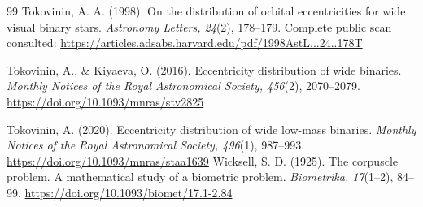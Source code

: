 \documentclass[11pt,a4paper]{article}
\theoremstyle{remark}\newtheorem{remark}[theorem]{Remark}
\begin{document}
\begin{thebibliography}{99}
Tokovinin, A. A. (1998). On the distribution of orbital eccentricities for wide visual binary stars. \emph{Astronomy Letters, 24}(2), 178--179. Complete public scan consulted: \url{https://articles.adsabs.harvard.edu/pdf/1998AstL...24..178T}

Tokovinin, A., \& Kiyaeva, O. (2016). Eccentricity distribution of wide binaries. \emph{Monthly Notices of the Royal Astronomical Society, 456}(2), 2070--2079. \url{https://doi.org/10.1093/mnras/stv2825}

Tokovinin, A. (2020). Eccentricity distribution of wide low-mass binaries. \emph{Monthly Notices of the Royal Astronomical Society, 496}(1), 987--993. \url{https://doi.org/10.1093/mnras/staa1639}
Wicksell, S. D. (1925). The corpuscle problem. A mathematical study of a biometric problem. \emph{Biometrika, 17}(1--2), 84--99. \url{https://doi.org/10.1093/biomet/17.1-2.84}
\end{thebibliography}
\end{document}
